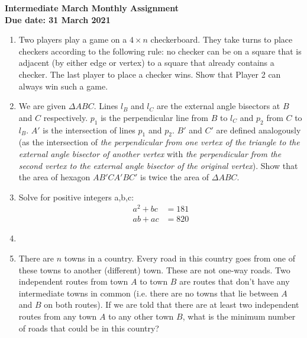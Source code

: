 \documentclass{article}
\begin{document}
\thispagestyle{empty}

\begin{center}
  \textbf{\Large Intermediate March Monthly Assignment}
  \\ \vspace{1em}
  \textbf{\large Due date: 31 March 2021}
\end{center}

\vfill
\vfill

\begin{enumerate}[1.]

\vfill
\item %
Two players play a game on a ${4\times n}$ checkerboard. They take turns to place checkers according to the following rule: no checker can be on a square that is adjacent (by either edge or vertex) to a square that already contains a checker. The last player to place a checker wins. Show that Player 2 can always win such a game.


\vfill
\item %
We are given ${\Delta ABC}$. Lines ${l_B}$ and ${l_C}$ are the external angle bisectors at ${B}$ and ${C}$ respectively. ${p_1}$ is the perpendicular line from ${B}$ to ${l_C}$ and ${p_2}$ from ${C}$ to ${l_B}$. ${A'}$ is the intersection of lines ${p_1}$ and ${p_2}$. ${B'}$ and ${C'}$ are defined analogously (as the intersection of \textit{the perpendicular from one vertex of the triangle to the external angle bisector of another vertex} with \textit{the perpendicular from the second vertex to the external angle bisector of the original vertex}). Show that the area of hexagon ${AB'CA'BC'}$ is twice the area of ${\Delta ABC}$.


\vfill
\item %
Solve for positive integers a,b,c:
\begin{align*}
a^2+bc&=181\\
ab+ac&=820
\end{align*}


\vfill
\item %


\vfill
\item %
There are $n$ towns in a country.
Every road in this country goes from one of these towns to another (different) town. These are not one-way roads.
Two independent routes from town $A$ to town $B$ are routes that don't have any intermediate towns in common (i.e. there are no towns that lie between $A$ and $B$ on both routes).
If we are told that there are at least two independent routes from any town $A$ to any other town $B$, what is the minimum number of roads that could be in this country?



\end{enumerate}
\end{document}
